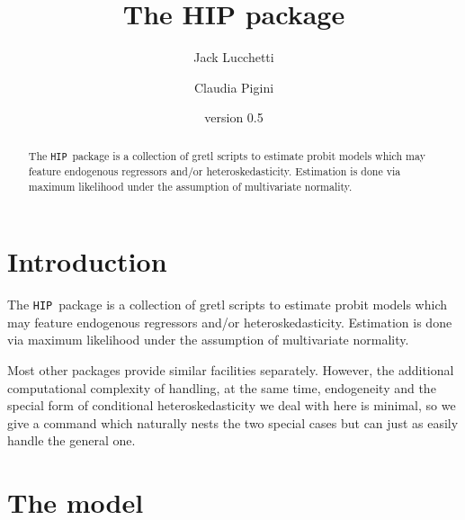 \documentclass[a4paper,10pt]{article}
\title{The HIP package}
\author{Jack Lucchetti \and Claudia Pigini}
\date{version 0.5}
\newcommand{\app}[1]{\textsf{#1}}
\newcounter{script}[section]
\newcommand{\HIP}{\texttt{HIP}}
\begin{document}
\maketitle

\begin{abstract}
The \HIP\ package is a collection of \app{gretl} scripts to estimate
probit models which may feature endogenous regressors and/or
heteroskedasticity. Estimation is done via maximum likelihood under
the assumption of multivariate normality.
\end{abstract}

\tableofcontents

\section{Introduction}
The \HIP\ package is a collection of \app{gretl} scripts to estimate
probit models which may feature endogenous regressors and/or
heteroskedasticity. Estimation is done via maximum likelihood under
the assumption of multivariate normality.

Most other packages provide similar facilities separately. However,
the additional computational complexity of handling, at the same time,
endogeneity and the special form of conditional heteroskedasticity we
deal with here is minimal, so we give a command which naturally nests
the two special cases but can just as easily handle the general one.

\section{The model}
\label{sec:model}
\end{document}
